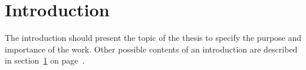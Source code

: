 %
%

\chapter{Introduction}\label{sec:introduction}

The introduction should present the topic of the thesis to specify the purpose and 
importance of the work. Other possible contents of an introduction are described 
in section~\ref{sec:introduction} on page~\pageref{sec:introduction}.

